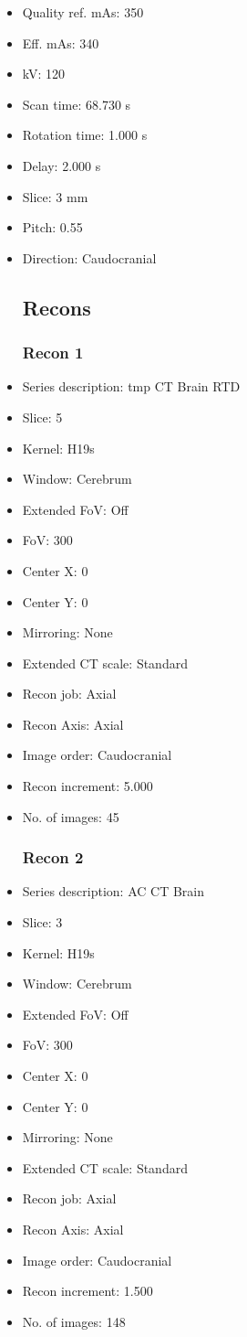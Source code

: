 \documentclass[12pt]{article}
\begin{document}
\begin{itemize}
\subsection{Scan}
\item Quality ref. mAs: 350\item Eff. mAs: 340\item kV: 120\item Scan time: 68.730 s\item Rotation time: 1.000 s\item Delay: 2.000 s\item Slice: 3 mm\item Pitch: 0.55\item Direction: Caudocranial\subsection{Recons}

\subsubsection{Recon 1}
\item Series description: tmp CT Brain RTD
\item Slice: 5
\item Kernel: H19s
\item Window: Cerebrum
\item Extended FoV: Off
\item FoV: 300
\item Center X: 0
\item Center Y: 0
\item Mirroring: None
\item Extended CT scale: Standard
\item Recon job: Axial
\item Recon Axis: Axial
\item Image order: Caudocranial
\item Recon increment: 5.000
\item No. of images: 45
\subsubsection{Recon 2}
\item Series description: AC CT Brain
\item Slice: 3
\item Kernel: H19s
\item Window: Cerebrum
\item Extended FoV: Off
\item FoV: 300
\item Center X: 0
\item Center Y: 0
\item Mirroring: None
\item Extended CT scale: Standard
\item Recon job: Axial
\item Recon Axis: Axial
\item Image order: Caudocranial
\item Recon increment: 1.500
\item No. of images: 148

\end{itemize}
\end{document}
